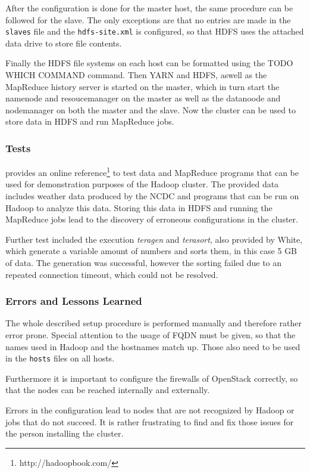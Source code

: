 After the configuration is done for the master host, the same procedure can be followed for the slave. 
The only exceptions are that no entries are made in the \texttt{slaves} file 
and the \texttt{hdfs-site.xml} is configured, so that \ac{HDFS} uses the attached data drive to store file contents.

Finally the \ac{HDFS} file systems on each host can be formatted using the TODO WHICH COMMAND command.
Then \ac{YARN} and \ac{HDFS}, aswell as the MapReduce history server is started on the master, 
which in turn start the namenode and resoucemanager on the master 
as well as the datanoode and nodemanager on both the master and the slave.
Now the cluster can be used to store data in \ac{HDFS} and run MapReduce jobs.

\subsubsection{Tests}
\autocite[][]{white2015hadoop} provides an online reference\footnote{http://hadoopbook.com/} 
to test data and MapReduce programs 
that can be used for demonstration purposes of the Hadoop cluster.
The provided data includes weather data produced by the \ac{NCDC} and programs that can be run on Hadoop to analyze this data. 
Storing this data in \ac{HDFS} and running the MapReduce jobs lead to the discovery of erroneous configurations in the cluster.

Further test included the execution \emph{teragen} and \emph{terasort}, also provided by White, which generate a variable amount of numbers and sorts them, in this case 5 \ac{GB} of data. 
The generation  was successful, however the sorting failed due to an repeated connection timeout, which could not be resolved.

\subsubsection{Errors and Lessons Learned}
The whole described setup procedure is performed manually 
and therefore rather error prone.
Special attention to the usage of \acs{FQDN} must be given, 
so that the names used in Hadoop and the hostnames match up.
Those also need to be used in the \texttt{hosts} files on all hosts.

Furthermore it is important to configure the firewalls of OpenStack correctly, 
so that the nodes can be reached internally and externally.

Errors in the configuration lead to nodes that are not recognized by Hadoop or jobs that do not succeed.
It is rather frustrating to find and fix those issues for the person installing the cluster.

